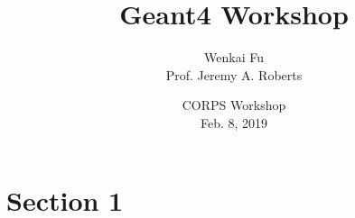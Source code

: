 \documentclass[fleqn]{beamer}
\title[Geant4 vs MCNP]{
    Geant4 Workshop}
\author[Wenkai Fu]{
    Wenkai Fu\\
    Prof. Jeremy A. Roberts}
\institute[Kansas State University]{
    Mechanical and Nuclear Engineering \\
    Kansas State University}
\date[CORPS, 2/8/2019]{
    CORPS Workshop\\
    Feb. 8, 2019}
\begin{document}
    \newcommand{\beginbackup}{
        \newcounter{framenumbervorappendix}
        \setcounter{framenumbervorappendix}{\value{framenumber}}
    }
    \newcommand{\backupend}{
        \addtocounter{framenumbervorappendix}{-\value{framenumber}}
        \addtocounter{framenumber}{\value{framenumbervorappendix}}
    }
    
    \begin{frame}
        \titlepage
    \end{frame}
    
    \section{Section 1}
    
\end{document}

